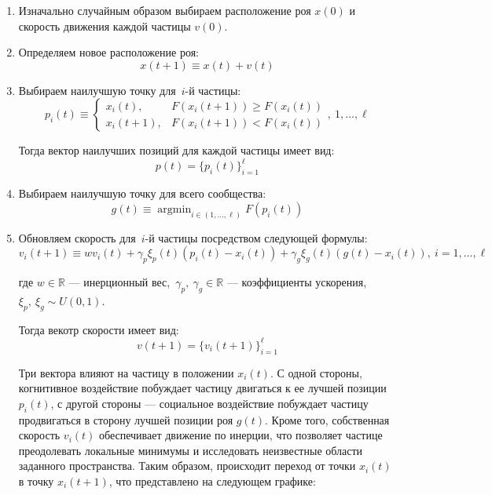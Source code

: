 \begin{enumerate}
	\item Изначально случайным образом выбираем расположение роя $x(0)$ и скорость движения каждой частицы $v(0)$.

	\item Определяем новое расположение роя:
	\[
		x(t + 1) \equiv x(t) + v(t)
	\]

	\item Выбираем наилучшую точку для~$i$-й частицы:
	\[
		p_i(t)
		\equiv
		\begin{cases}
			x_i(t),
			&
			F(x_i(t + 1)) \geq F(x_i(t))
			\\
			x_i(t + 1),
			&
			F(x_i(t + 1)) < F(x_i(t))
		\end{cases}, \ 1, ..., \ell
	\]

	Тогда вектор наилучших позиций для каждой частицы имеет вид:
	\[
		p(t) = \{p_i(t)\}_{i = 1}^{\ell}
	\]

	\item Выбираем наилучшую точку для всего сообщества:
	\[
		g(t)
		\equiv
		\mathop{\mathrm{argmin}}_{i \in (1, ..., \ell)} \limits F(p_i(t))
	\]

	\item Обновляем скорость для~$i$-й частицы посредством следующей формулы:
	\[
		v_i(t + 1)
		\equiv
		w
		v_i(t)
		+
		\gamma_p
		\xi_p(t)
		(p_i(t) - x_i(t))
		+
		\gamma_g
		\xi_g(t)
		(g(t) - x_i(t)), \
		i = 1, ..., \ell
	\]

	где $w \in \mathbb{R}$ --- инерционный вес,~$\gamma_p,\ \gamma_g \in \mathbb{R}$ --- коэффициенты ускорения, $\xi_p,\ \xi_g \sim U(0, 1)$.

	Тогда векотр скорости имеет вид:
	\[
		v(t+1) = \{v_i(t + 1)\}_{i = 1}^{\ell}
	\]

	Три вектора влияют на частицу в положении $x_i(t)$. С одной стороны, когнитивное воздействие побуждает частицу двигаться к ее лучшей позиции $p_i(t)$, с другой стороны --- социальное воздействие побуждает частицу продвигаться в сторону лучшей позиции роя $g(t)$. Кроме того, собственная скорость $v_i(t)$ обеспечивает движение по инерции, что позволяет частице преодолевать локальные минимумы и исследовать неизвестные области заданного пространства. Таким образом, происходит переход от точки $x_i(t)$ в точку $x_i(t+1)$, что представлено на следующем графике:


	\begin{tikzpicture}[x=0.75pt,y=0.75pt,yscale=-1,xscale=1]
	\centering


\end{tikzpicture}
\end{enumerate}

